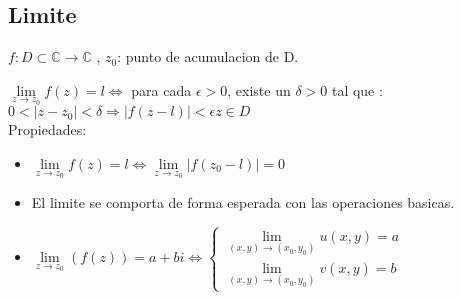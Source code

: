 \documentclass[12pt,a4paper]{article}
\begin{document}
\subsection*{Limite}
$f: D \subset \mathbb{C} \to  \mathbb{C} $ , $ z_{0}$: punto de acumulacion de D.

   $\lim\limits_{z \to z_{0}}f(z)=l \Leftrightarrow $ para cada $\epsilon >0$, existe un $\delta > 0$ tal que :\\
    \hspace*{3cm} $ 0<|z-z_{0}|<\delta\Rightarrow |f(z-l)| < \epsilon z\in D$\\
    Propiedades:
    \begin{itemize}
        \item  $\lim\limits_{z \to z_{0}}f(z)=l \Leftrightarrow  \lim\limits_{z \to z_{0}}|f(z_{0}-l)|=0  $
        \item El limite se comporta de forma esperada con las operaciones basicas.
        \item $\lim\limits_{z \to z_{0}}(f(z))=a+bi \Leftrightarrow \begin{cases}
            \lim\limits_{(x,y) \to (x_{0},y_{0})}u(x,y)=a\\
            \lim\limits_{(x,y) \to (x_{0},y_{0})}v(x,y)=b
        \end{cases} $
    \end{itemize}   
\end{document}
